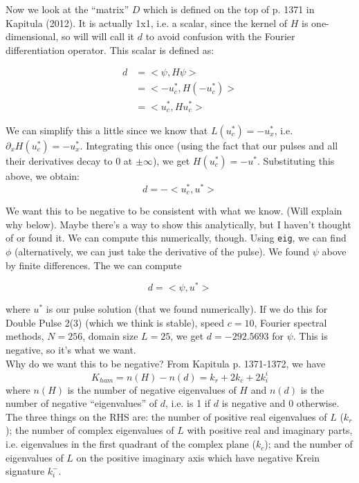 \documentclass[12pt]{article}
\begin{document}
Now we look at the ``matrix'' $D$ which is defined on the top of p. 1371 in Kapitula (2012). It is actually 1x1, i.e. a scalar, since the kernel of $H$ is one-dimensional, so will will call it $d$ to avoid confusion with the Fourier differentiation operator. This scalar is defined as:

\begin{align}
d &= <\psi, H \psi>\\
&= <-u^*_c, H (-u^*_c) >\\
&= <u^*_c, H u^*_c>
\end{align}

We can simplify this a little since we know that $L(u^*_c) = -u^*_x$, i.e. $\partial_x H(u^*_c) = -u^*_x$. Integrating this once (using the fact that our pulses and all their derivatives decay to 0 at $\pm \infty$), we get $H(u^*_c) = -u^*$. Substituting this above, we obtain:
\[
d = -<u^*_c, u^*>
\]

We want this to be negative to be consistent with what we know. (Will explain why below). Maybe there's a way to show this analytically, but I haven't thought of or found it. We can compute this numerically, though. Using \texttt{eig}, we can find $\phi$ (alternatively, we can just take the derivative of the pulse). We found $\psi$ above by finite differences. The we can compute 

\[
d = <\psi, u^*>
\]

where $u^*$ is our pulse solution (that we found numerically). If we do this for Double Pulse 2(3) (which we think is stable), speed $c = 10$, Fourier spectral methods, $N = 256$, domain size $L = 25$, we get $d = -292.5693$ for $\psi$. This is negative, so it's what we want.\\

Why do we want this to be negative? From Kapitula p. 1371-1372, we have
\begin{equation}
K_{ham} = n(H) - n(d) = k_r + 2 k_c + 2 k_i^i
\end{equation}
where $n(H)$ is the number of negative eigenvalues of $H$ and $n(d)$ is the number of negative ``eigenvalues'' of $d$, i.e. is 1 if $d$ is negative and 0 otherwise. The three things on the RHS are: the number of positive real eigenvalues of $L$ ($k_r$); the number of complex eigenvalues of $L$ with positive real and imaginary parts, i.e. eigenvalues in the first quadrant of the complex plane ($k_c$); and the number of eigenvalues of $L$ on the positive imaginary axis which have negative Krein signature $k_i^-$. \\
\end{document}
